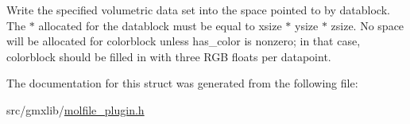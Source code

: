 \-Write the specified volumetric data set into the space pointed to by datablock. \-The $\ast$ allocated for the datablock must be equal to xsize $\ast$ ysize $\ast$ zsize. \-No space will be allocated for colorblock unless has\-\_\-color is nonzero; in that case, colorblock should be filled in with three \-R\-G\-B floats per datapoint. 

\-The documentation for this struct was generated from the following file\-:\begin{DoxyCompactItemize}
\item 
src/gmxlib/\hyperlink{molfile__plugin_8h}{molfile\-\_\-plugin.\-h}\end{DoxyCompactItemize}
